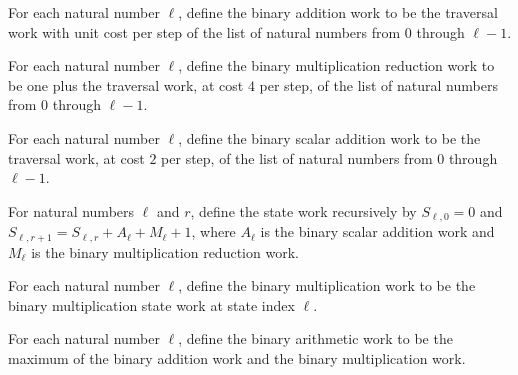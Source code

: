 \begin{definition}
\label{FABL.binaryAddWork}
\leanok
{}
For each natural number $\ell$, define the binary addition work to be the traversal work
with unit cost per step of the list of natural numbers from $0$ through $\ell-1$.
\end{definition}

\begin{definition}
\label{FABL.binaryXMulModWork}
\leanok
{}
For each natural number $\ell$, define the binary multiplication reduction work to be
one plus the traversal work, at cost $4$ per step, of the list of natural numbers from
$0$ through $\ell-1$.
\end{definition}

\begin{definition}
\label{FABL.binaryScaleAddWork}
\leanok
{}
For each natural number $\ell$, define the binary scalar addition work to be the
traversal work, at cost $2$ per step, of the list of natural numbers from $0$ through
$\ell-1$.
\end{definition}

\begin{definition}
\label{FABL.binaryMulModStateWork}
\leanok
{}
For natural numbers $\ell$ and $r$, define the state work recursively by $S_{\ell,0}=0$
and $S_{\ell,r+1}=S_{\ell,r}+A_\ell+M_\ell+1$, where $A_\ell$ is the binary scalar
addition work and $M_\ell$ is the binary multiplication reduction work.
\end{definition}

\begin{definition}
\label{FABL.binaryMulModWork}
\leanok
{}
For each natural number $\ell$, define the binary multiplication work to be the binary
multiplication state work at state index $\ell$.
\end{definition}

\begin{definition}
\label{FABL.binaryArithmeticWork}
\leanok
{}
For each natural number $\ell$, define the binary arithmetic work to be the maximum of
the binary addition work and the binary multiplication work.
\end{definition}

